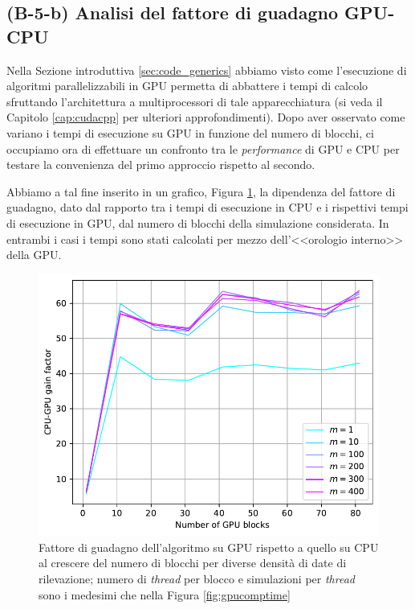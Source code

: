 \subsection{(B-5-b) Analisi del fattore di guadagno GPU-CPU}

Nella Sezione introduttiva \ref{sec:code_generics} abbiamo visto come l'esecuzione di algoritmi parallelizzabili in GPU permetta di abbattere i tempi di calcolo sfruttando l'architettura a multiprocessori di tale apparecchiatura (si veda il Capitolo \ref{cap:cudacpp} per ulteriori approfondimenti). Dopo aver osservato come variano i tempi di esecuzione su GPU in funzione del numero di blocchi, ci occupiamo ora di effettuare un confronto tra le \textit{performance} di GPU e CPU per testare la convenienza del primo approccio rispetto al secondo.

Abbiamo a tal fine inserito in un grafico, Figura \ref{fig:gainfactor}, la dipendenza del fattore di guadagno, dato dal rapporto tra i tempi di esecuzione in CPU e i rispettivi tempi di esecuzione in GPU, dal numero di blocchi della simulazione considerata. In entrambi i casi i tempi sono stati calcolati per mezzo dell'<<orologio interno>> della GPU. 

\begin{figure}[t]
    \centering
    \includegraphics[scale=0.5]{graphs/GainFactor_Tesla_GainFactorVsBlocks_VariousM.pdf}
    \caption{Fattore di guadagno dell'algoritmo su GPU rispetto a quello su CPU al crescere del numero di blocchi per diverse densità di date di rilevazione; numero di \textit{thread} per blocco e simulazioni per \textit{thread} sono i medesimi che nella Figura \ref{fig:gpucomptime}}
    \label{fig:gainfactor}
\end{figure}

